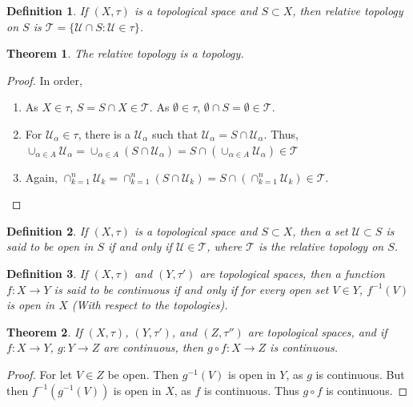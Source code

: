 \documentclass[oneside]{book}
\theoremstyle{mystyle}
\newtheorem{theorem}{Theorem}[section]
\newtheorem{definition}{Definition}[section]
\begin{document}
\begin{definition}
If $(X,\tau)$ is a topological space and $S\subset X$, then relative topology on $S$ is $\mathscr{T}=\{\mathcal{U}\cap S:\mathcal{U}\in \tau\}$.
\end{definition}

\begin{theorem}
The relative topology is a topology.
\end{theorem}
\begin{proof}
In order,
\begin{enumerate}
\item As $X\in \tau$, $S=S\cap X \in \mathscr{T}$. As $\emptyset\in \tau$, $\emptyset\cap S = \emptyset \in \mathscr{T}$. 
\item For $\mathscr{U}_\alpha\in \mathscr{\tau}$, there is a $\mathcal{U}_\alpha$ such that $\mathscr{U}_\alpha = S\cap \mathcal{U}_\alpha$. Thus, $\cup_{\alpha \in A} \mathscr{U}_\alpha = \cup_{\alpha \in A}(S\cap \mathcal{U}_\alpha) = S\cap (\cup_{\alpha \in A}\mathscr{U}_\alpha)\in \mathscr{T}$
\item Again, $\cap_{k=1}^{n} \mathscr{U}_k = \cap_{k=1}^{n}(S\cap \mathcal{U}_k) = S\cap (\cap_{k=1}^{n} \mathcal{U}_k)\in \mathscr{T}$.
\end{enumerate}
\end{proof}

\begin{definition}
If $(X,\tau)$ is a topological space and $S\subset X$, then a set $\mathcal{U}\subset S$ is said to be open in $S$ if and only if $\mathcal{U}\in \mathscr{T}$, where $\mathscr{T}$ is the relative topology on $S$.
\end{definition}

\begin{definition}
If $(X,\tau)$ and $(Y,\tau')$ are topological spaces, then a function $f:X\rightarrow Y$ is said to be continuous if and only if for every open set $V\in Y$, $f^{-1}(V)$ is open in $X$ (With respect to the topologies).
\end{definition}

\begin{theorem}
If $(X,\tau)$, $(Y,\tau')$, and $(Z,\tau'')$ are topological spaces, and if $f:X\rightarrow Y$, $g:Y\rightarrow Z$ are continuous, then $g\circ f:X\rightarrow Z$ is continuous. 
\end{theorem}
\begin{proof}
For let $V\in Z$ be open. Then $g^{-1}(V)$ is open in $Y$, as $g$ is continuous. But then $f^{-1}(g^{-1}(V))$ is open in $X$, as $f$ is continuous. Thus $g\circ f$ is continuous.
\end{proof}
\end{document}
